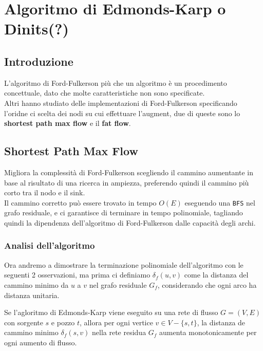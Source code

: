 \chapter{Algoritmo di Edmonds-Karp o Dinits(?)}
\section{Introduzione}
L'algoritmo di Ford-Fulkerson più che un algoritmo è un procedimento concettuale, dato che molte caratteristiche non sono specificate.\\

Altri hanno studiato delle implementazioni di Ford-Fulkerson specificando l'oridne ci scelta dei nodi su cui effettuare l'augment, due di queste sono lo \textbf{shortest path max flow} e il \textbf{fat flow}.


\section{Shortest Path Max Flow}
Migliora la complessità di Ford-Fulkerson scegliendo il cammino aumentante in base al risultato di una ricerca in ampiezza, preferendo quindi il cammino più corto tra il nodo e il sink.\\

Il cammino corretto può essere trovato in tempo $O(E)$ eseguendo una \texttt{BFS} nel grafo residuale, e ci garantisce di terminare in tempo polinomiale, tagliando quindi la dipendenza dell'algoritmo di Ford-Fulkerson dalle capacità degli archi.

\subsection{Analisi dell'algoritmo}
Ora andremo a dimostrare la terminazione polinomiale dell'algoritmo con le seguenti 2 osservazioni, ma prima ci definiamo $\delta_f(u,v)$ come la distanza del cammino minimo da $u$ a $v$ nel grafo residuale $G_f$, considerando che ogni arco ha distanza unitaria.

\begin{myblockquote}
    Se l'agloritmo di Edmonds-Karp viene eseguito su una rete di flusso $G = (V,
        E)$ con sorgente $s$ e pozzo $t$, allora per ogni vertice $v \in V -
        \{s,t\}$, la distanza de cammino minimo $\delta_f(s,v)$ nella rete residua
    $G_f$ aumenta \linebreak monotonicamente per ogni aumento di flusso.
\end{myblockquote}

